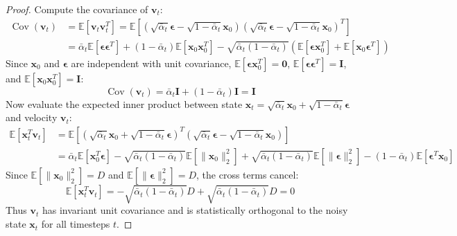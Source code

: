 \documentclass[11pt,a4paper]{article}
\theoremstyle{definition}
\begin{document}
\begin{proof}
Compute the covariance of $\mathbf{v}_t$:
{\boldmath
\begin{align}
\operatorname{Cov}(\mathbf{v}_t) &= \mathbb{E}\left[ \mathbf{v}_t \mathbf{v}_t^T \right] = \mathbb{E}\left[ \left( \sqrt{\bar{\alpha}_t}\boldsymbol{\epsilon} - \sqrt{1 - \bar{\alpha}_t}\mathbf{x}_0 \right) \left( \sqrt{\bar{\alpha}_t}\boldsymbol{\epsilon} - \sqrt{1 - \bar{\alpha}_t}\mathbf{x}_0 \right)^T \right] \\
&= \bar{\alpha}_t \mathbb{E}[\boldsymbol{\epsilon}\boldsymbol{\epsilon}^T] + (1 - \bar{\alpha}_t)\mathbb{E}[\mathbf{x}_0\mathbf{x}_0^T] - \sqrt{\bar{\alpha}_t(1 - \bar{\alpha}_t)}\left( \mathbb{E}[\boldsymbol{\epsilon}\mathbf{x}_0^T] + \mathbb{E}[\mathbf{x}_0\boldsymbol{\epsilon}^T] \right)
\end{align}
}
Since $\mathbf{x}_0$ and $\boldsymbol{\epsilon}$ are independent with unit covariance, $\mathbb{E}[\boldsymbol{\epsilon}\mathbf{x}_0^T] = \mathbf{0}$, $\mathbb{E}[\boldsymbol{\epsilon}\boldsymbol{\epsilon}^T] = \mathbf{I}$, and $\mathbb{E}[\mathbf{x}_0\mathbf{x}_0^T] = \mathbf{I}$:
{\boldmath
\begin{equation}
\operatorname{Cov}(\mathbf{v}_t) = \bar{\alpha}_t \mathbf{I} + (1 - \bar{\alpha}_t)\mathbf{I} = \mathbf{I}
\end{equation}
}
Now evaluate the expected inner product between state $\mathbf{x}_t = \sqrt{\bar{\alpha}_t}\mathbf{x}_0 + \sqrt{1 - \bar{\alpha}_t}\boldsymbol{\epsilon}$ and velocity $\mathbf{v}_t$:
{\boldmath
\begin{align}
\mathbb{E}\left[ \mathbf{x}_t^T \mathbf{v}_t \right] &= \mathbb{E}\left[ \left( \sqrt{\bar{\alpha}_t}\mathbf{x}_0 + \sqrt{1 - \bar{\alpha}_t}\boldsymbol{\epsilon} \right)^T \left( \sqrt{\bar{\alpha}_t}\boldsymbol{\epsilon} - \sqrt{1 - \bar{\alpha}_t}\mathbf{x}_0 \right) \right] \\
&= \bar{\alpha}_t \mathbb{E}[\mathbf{x}_0^T \boldsymbol{\epsilon}] - \sqrt{\bar{\alpha}_t(1 - \bar{\alpha}_t)}\mathbb{E}[\|\mathbf{x}_0\|_2^2] + \sqrt{\bar{\alpha}_t(1 - \bar{\alpha}_t)}\mathbb{E}[\|\boldsymbol{\epsilon}\|_2^2] - (1 - \bar{\alpha}_t)\mathbb{E}[\boldsymbol{\epsilon}^T \mathbf{x}_0]
\end{align}
}
Since $\mathbb{E}[\|\mathbf{x}_0\|_2^2] = D$ and $\mathbb{E}[\|\boldsymbol{\epsilon}\|_2^2] = D$, the cross terms cancel:
{\boldmath
\begin{equation}
\mathbb{E}\left[ \mathbf{x}_t^T \mathbf{v}_t \right] = -\sqrt{\bar{\alpha}_t(1 - \bar{\alpha}_t)} D + \sqrt{\bar{\alpha}_t(1 - \bar{\alpha}_t)} D = 0
\end{equation}
}
Thus $\mathbf{v}_t$ has invariant unit covariance and is statistically orthogonal to the noisy state $\mathbf{x}_t$ for all timesteps $t$.
\end{proof}
\end{document}
